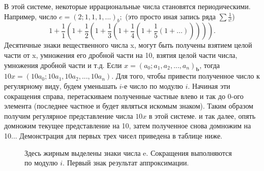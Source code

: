\documentclass{book}
\begin{document}
\begin{normalsize}
В этой системе, некоторые иррациональные числа становятся периодическими. Например, число $e = (2; 1, 1, 1, ...)_b;$ (это просто иная запись ряда $\sum \frac{1}{i!}$)\\
$$1+\frac{1}{1}(1+\frac{1}{2}(1+\frac{1}{3}(1+\frac{1}{4}(1+\frac{1}{5}(1 + ...))))).$$
Десятичные знаки вещественного числа x, могут быть получены взятием целой части от x, умножения его дробной части на 10, взятия целой части числа, умножения дробной части и т.д. Если $x = (a_0;a_1,a_2,...,a_n)_{\textbf{b}}$, тогда $10x = (10a_0;10a_1,10a_2, ... , 10a_n)$. Для того, чтобы привести полученное число к регулярному виду, будем уменьшать $i$-е число по модулю $i$. Начиная эти сокращения справа, перетаскиваем полученные частные влево и так до 0-ого элемента (последнее частное и будет являться искомым знаком). Таким образом получим регулярное представление числа $10x$ в этой системе. и так далее, опять домножим текущее представление на 10, затем полученное снова домножим на 10... Демонстрация для первых трех чисел приведена в таблице ниже.
\begin{figure}[h!]
\caption{Здесь жирным выделены знаки числа e. Сокращения выполняются по модулю $i$. Первый знак результат аппроксимации.}
\end{figure}
\end{normalsize}
\end{document}
